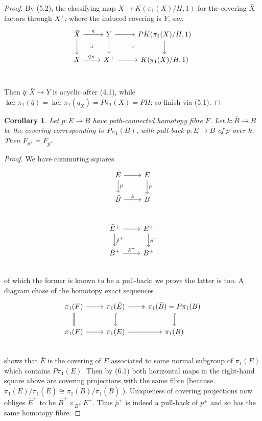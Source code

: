 \documentclass[openany,leqno]{book}  %
\newtheorem{corollary}[theorem]{Corollary}
\begin{document}
\begin{proof}
By (5.2), the classifying map $X \longrightarrow K(\pi_1(X)/H, 1)$ for the covering $\bar{X}$ factors through $X^+$, where the induced covering is $Y$, say.
\[
\begin{tikzcd}
 \bar{X} \arrow{r}{\bar{q}} \arrow{d} \arrow[dr, phantom, "\lrcorner"] & Y \arrow{d} \arrow{r} \arrow[dr, phantom, "\lrcorner"]&PK(\pi_1(X)/H,1) \arrow{d} \\
 X \arrow{r}{q_X} & X^+ \arrow[r] & K(\pi_1(X)/H,1)\\
 \end{tikzcd}
 \]

Then $\bar{q} \colon   \bar{X}\longrightarrow Y$ is acyclic after (4.1), while $\ker \pi_1(\bar{q}) = \ker \pi_1(q_X) = P\pi_1(X) =PH$; so finish via (5.1).
\end{proof}

\begin{corollary}
  Let $p \colon   E \longrightarrow B$ have path-connected homotopy fibre $F$. Let $k \colon   \bar{B} \longrightarrow B$ be the covering corresponding to $P\pi_1(B)$, with pull-back $\bar{p} \colon  \bar{E} \longrightarrow \bar{B}$ of $p$ over $k$. Then $F_{p^+}=F_{\bar{p}^+} $
\end{corollary}
\begin{proof}
 We have commuting squares
\[
\begin{tikzcd}
 \bar{E} \arrow{r} \arrow{d}{\bar{p}}  & E \arrow{d}{p} \\
 \bar{B} \arrow{r}{k} & B\\
 \end{tikzcd}
 \]
 \[
\begin{tikzcd}
 \bar{E}^+ \arrow{r} \arrow{d}{\bar{p}^+}  & E^+ \arrow{d}{p^+} \\
 \bar{B}^+ \arrow{r}{k^+} & B^+\\
 \end{tikzcd}
 \]
of which the former is known to be a pull-back; we prove the latter is too. A diagram chase of the homotopy exact sequences
\[
\begin{tikzcd}
 \pi_1(F) \arrow{r} \arrow[equal]{d} & \pi_1(\bar{E})  \arrow[hook]{d} \arrow[two heads]{r} & \pi_1(\bar{B})=P\pi_1(B) \arrow[hook]{d}\\
 \pi_1(F)  \arrow{r} & \pi_1(E) \arrow{r} &\pi_1(B)\\
 \end{tikzcd}
 \]
shows that $\bar{E}$ is the covering of $E$ associated to some normal subgroup of $\pi_1(E)$ which contains $P\pi_1(E)$. Then by (6.1) both horizontal maps in the right-hand square above are covering projections with the same fibre (because $\pi_1(E)/\pi_1(\bar{E}) \cong \pi_1(B)/\pi_1(\bar{B})$ ). Uniqueness of covering projections now obliges $\bar{E}^+$ to be $\bar{B}^+ \times_{B^+} E^+$. Thus $\bar{p}^+$ is indeed a pull-back of $p^+$ and so has the
same homotopy fibre.
 \end{proof}
  
\end{document}
